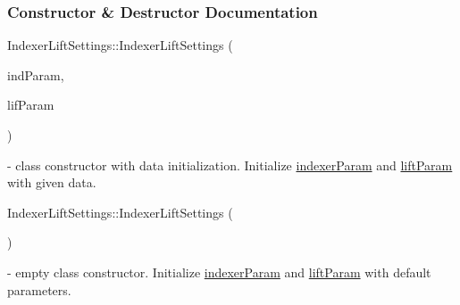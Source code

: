 \subsubsection{Constructor \& Destructor Documentation}
\mbox{\label{classIndexerLiftSettings_aa334786f67544a57de7253b930eb3528}} 
{\footnotesize\ttfamily Indexer\+Lift\+Settings\+::\texorpdfstring{Indexer\+Lift\+Settings}{IndexerLiftSettings}{\footnotesize\ttfamily [1/2]} (\begin{DoxyParamCaption}\item[{\mbox{\hyperlink{classIndexerLiftSettings_a6b75f15b6abc72b9070642cb8b5408ca}{Indexer\+Lift\+Settings\+::\+Index\+Parameters}}}]{ind\+Param,  }\item[{\mbox{\hyperlink{classIndexerLiftSettings_a83fd6fc58021bc526b681c1ce840f686}{Indexer\+Lift\+Settings\+::\+Lift\+Parameters}}}]{lif\+Param }\end{DoxyParamCaption})} - class constructor with data initialization. Initialize \hyperlink{classIndexerLiftSettings_a09875fa890744d5de30f06b2d580bb24}{indexer\+Param} and \hyperlink{classIndexerLiftSettings_ae9649b8642d20d02892fc4abaad687f7}{lift\+Param} with given data.

\mbox{\label{classIndexerLiftSettings_ad3adde70e8138f9f775ff9177ce290fe}} 
{\footnotesize\ttfamily Indexer\+Lift\+Settings\+::\texorpdfstring{Indexer\+Lift\+Settings}{IndexerLiftSettings}{\footnotesize\ttfamily [2/2]} (\begin{DoxyParamCaption}{ }\end{DoxyParamCaption})} - empty class constructor. Initialize \hyperlink{classIndexerLiftSettings_a09875fa890744d5de30f06b2d580bb24}{indexer\+Param} and \hyperlink{classIndexerLiftSettings_ae9649b8642d20d02892fc4abaad687f7}{lift\+Param} with default parameters.

